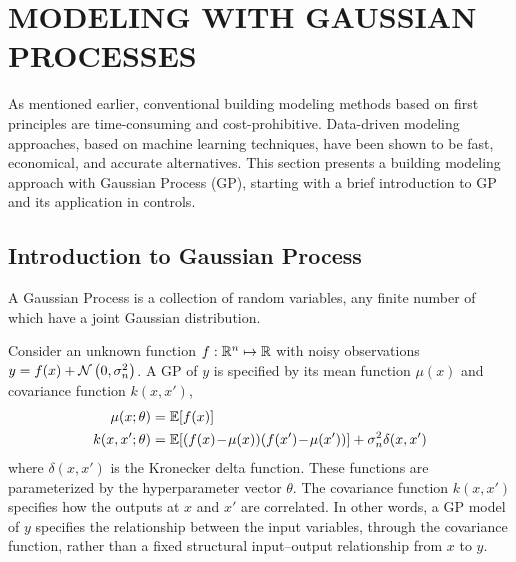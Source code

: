 \section{MODELING WITH GAUSSIAN PROCESSES}
\label{S:gp}

As mentioned earlier, conventional building modeling methods based on first principles are time-consuming and cost-prohibitive.
Data-driven modeling approaches, based on machine learning techniques, have been shown to be fast, economical, and accurate alternatives.
This section presents a building modeling approach with Gaussian Process (GP), starting with a brief introduction to GP and its application in controls.

\subsection{Introduction to Gaussian Process}
\label{sec:gp:gp-intro}

\begin{definition}%
A Gaussian Process is a collection of random variables, any finite number of which have a joint Gaussian distribution.
\end{definition}
%
Consider an unknown function \(f: \mathbb{R}^n \mapsto \mathbb{R}\) with noisy observations \(y = f(x) + \operatorname*{\mathcal{N}}\left(0, \sigma_n^2\right)\).
A GP of \(y\) is specified by its mean function \(\mu(x)\) and covariance function \(k(x,x')\),
\begin{align}
\label{E:gp:prior}
\mu(x; \theta) &= \mathbb{E} [f(x)] \\
k(x,x'; \theta) &= \mathbb{E} [(f(x)\!-\!\mu(x)) (f(x') \!-\! \mu(x'))] + \sigma_n^2 \delta(x,x') \nonumber
\end{align}
where \(\delta(x,x')\) is the Kronecker delta function.
These functions are parameterized by the hyperparameter vector \(\theta\).
The covariance function \(k(x,x')\) specifies how the outputs at \(x\) and \(x'\) are correlated.
In other words, a GP model of \(y\) specifies the relationship between the input variables, through the covariance function, rather than a fixed structural input--output relationship from $x$ to $y$.

